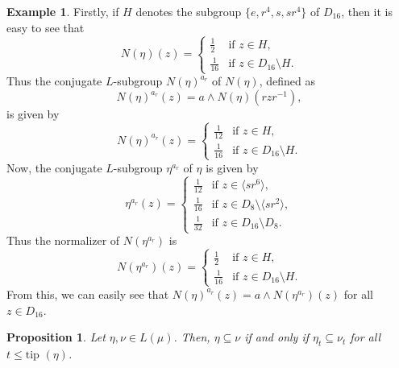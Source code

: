 \documentclass[10pt]{article}
\theoremstyle{plain}
\newtheorem{proposition}[theorem]{Proposition}
\theoremstyle{definition}
\newtheorem{example}{\sc Example}
\theoremstyle{remark}
\theoremstyle{case}
\begin{document}
\begin{example}
	\noindent Firstly, if $H$ denotes the subgroup $\{e, r^4, s, sr^4 \}$ of $D_{16}$, then it is easy to see that 
	\[ N(\eta)(z) = \begin{cases}
		\frac{1}{2} &\text{if } z \in H, \\
		\frac{1}{16} &\text{if } z \in D_{16} \setminus H.
	\end{cases} \]
	Thus the conjugate $L$-subgroup $N(\eta)^{a_r}$ of $N(\eta)$, defined as
	\[ N(\eta)^{a_r}(z) = a \wedge N(\eta)(rzr^{-1}), \]
	is given by
	\[ N(\eta)^{a_r}(z) = \begin{cases}
		\frac{1}{12} &\text{if } z \in H, \\
		\frac{1}{16} &\text{if } z \in D_{16} \setminus H.
	\end{cases} \] 
	Now, the conjugate $L$-subgroup $\eta^{a_r}$ of $\eta$ is given by
	\[ \eta^{a_r}(z) = \begin{cases}
		\frac{1}{12} &\text{if } z \in \langle sr^6 \rangle, \\
		\frac{1}{16} &\text{if } z \in D_8 \setminus \langle sr^2 \rangle, \\
		\frac{1}{32} &\text{if } z \in D_{16} \setminus D_8.
	\end{cases} \]
	Thus the normalizer of $N(\eta^{a_r})$ is 
	\[ N(\eta^{a_r})(z) = \begin{cases}
		\frac{1}{2} &\text{if } z \in H, \\
		\frac{1}{16} &\text{if } z \in D_{16} \setminus H.
	\end{cases} \]
	From this, we can easily see that $N(\eta)^{a_r}(z) = a \wedge N(\eta^{a_r})(z)$ for all $z \in D_{16}$.
\end{example}

\begin{proposition}\label{inc_lvl}
	Let $\eta, \nu \in L(\mu)$. Then, $\eta \subseteq \nu$ if and only if $\eta_t \subseteq \nu_t$ for all $t \leq \text{tip }(\eta)$.
\end{proposition}
\end{document}
